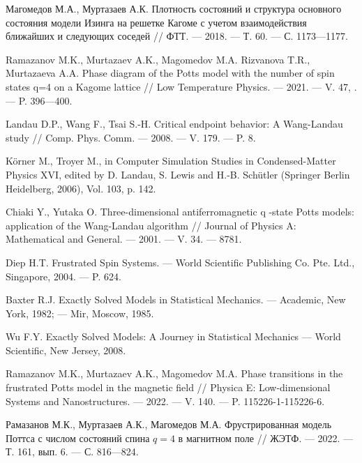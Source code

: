\begin{thebibliography}{99}
Магомедов М.А., Муртазаев А.К.
Плотность состояний и структура основного состояния модели Изинга на решетке Кагоме с учетом взаимодействия ближайших и следующих соседей
//
ФТТ.
--- 2018.
--- Т. 60.
--- С. 1173---1177.




Ramazanov M.K., Murtazaev A.K., Magomedov M.A. Rizvanova T.R., Murtazaeva A.A.
Phase diagram of the Potts model with the number of spin states q=4 on a Kagome lattice
//
Low Temperature Physics.
--- 2021.
--- V. 47, .
--- P. 396---400.




Landau D.P., Wang F., Tsai S.-H.
Critical endpoint behavior: A Wang-Landau study
//
Comp. Phys. Comm.
--- 2008.
--- V. 179.
--- P. 8.




Körner M., Troyer M., in Computer Simulation Studies in Condensed-Matter Physics XVI, edited by D. Landau, S. Lewis and H.-B. Schütler (Springer Berlin Heidelberg, 2006), Vol. 103, p. 142.




Chiaki Y., Yutaka O.
Three-dimensional antiferromagnetic q -state Potts models: application of the Wang-Landau algorithm
//
Journal of Physics A: Mathematical and General.
--- 2001.
--- V. 34.
--- 8781.




Diep H.T.
Frustrated Spin Systems.
--- World Scientific Publishing Co. Pte. Ltd., Singapore, 2004.
--- P. 624.




Baxter R.J.
Exactly Solved Models in Statistical Mechanics.
--- Academic, New York, 1982;
--- Mir, Moscow, 1985.




Wu F.Y.
Exactly Solved Models: A Journey in Statistical Mechanics
--- World Scientific, New Jersey, 2008.




Ramazanov M.K., Murtazaev A.K., Magomedov M.A.
Phase transitions in the frustrated Potts model in the magnetic field
//
Physica E: Low-dimensional Systems and Nanostructures.
--- 2022.
--- V. 140.
--- P. 115226-1-115226-6.




Рамазанов М.К., Муртазаев А.К., Магомедов М.А.
Фрустрированная модель Поттса с числом состояний спина $q = 4$ в магнитном поле
//
ЖЭТФ.
--- 2022.
--- Т. 161, вып. 6.
--- С. 816---824.





\end{thebibliography} 